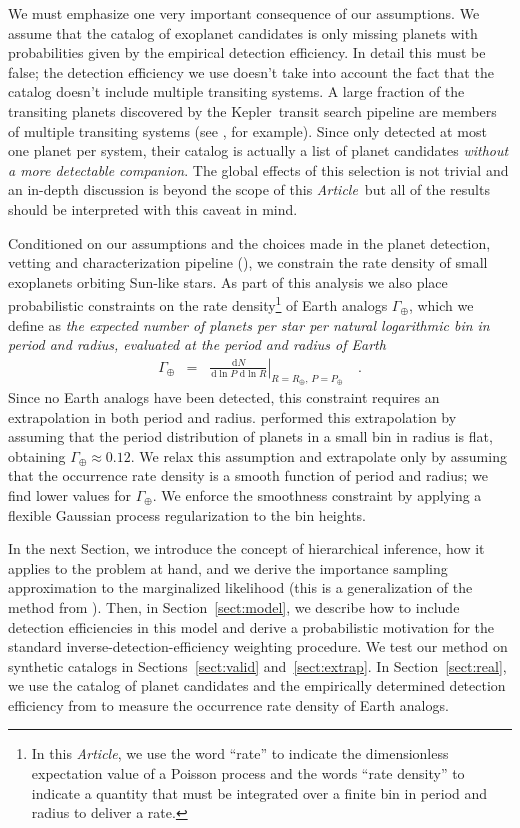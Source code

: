 \documentclass[12pt,preprint]{aastex}
\newcommand{\project}[1]{{\sffamily #1}}
\newcommand{\kepler}{\project{Kepler}}
\newcommand{\paper}{\textsl{Article}}
\newcommand{\Sect}[1]{Section~\ref{sect:#1}}
\newcommand{\sect}[1]{\Sect{#1}}
\newcommand{\sectalt}[1]{\ref{sect:#1}}
\newcommand{\dd}{\ensuremath{\,\mathrm{d}}}
\newcommand{\rate}{\ensuremath{\Gamma}}
\newcommand{\radius}{\ensuremath{R}}
\newcommand{\period}{\ensuremath{P}}
\newcommand{\gammaearth}{{\ensuremath{\rate_\oplus}}}
\begin{document}
We must emphasize one very important consequence of our assumptions.
We assume that the catalog of exoplanet candidates is only missing planets
with probabilities given by the empirical detection efficiency.
In detail this must be false; the detection efficiency we use
doesn't take into account the fact that the catalog doesn't include multiple
transiting systems.
A large fraction of the transiting planets discovered by the \kepler\ transit
search pipeline are members of multiple transiting systems (see
\citealt{lissauer}, for example).
Since \citet{petigura} only detected at most one planet per system, their
catalog is actually a list of planet candidates \emph{without a more
detectable companion}.
The global effects of this selection is not trivial and an in-depth discussion
is beyond the scope of this \paper\ but all of the results should be
interpreted with this caveat in mind.

Conditioned on our assumptions and the choices made in the planet detection,
vetting and characterization pipeline (\citealt{petigura-a, petigura}), we
constrain the rate density of small exoplanets orbiting Sun-like stars.
As part of this analysis we also place probabilistic constraints on the rate
density\footnote{In this \paper, we use the word ``rate'' to indicate the
dimensionless expectation value of a Poisson process and the words ``rate
density'' to indicate a quantity that must be integrated over a finite bin in
period and radius to deliver a rate.} of Earth analogs \gammaearth, which we
define as \emph{the expected number of planets per star per natural
logarithmic bin in period and radius, evaluated at the period and radius of
Earth}
\begin{eqnarray}
\gammaearth &=&
\left.\frac{\dd N}{\dd\ln\period\,\dd\ln\radius}\right|
_{\radius=\radius_\oplus,\,\period=\period_\oplus}\quad.
\end{eqnarray}
Since no Earth analogs have been detected, this constraint requires an
extrapolation in both period and radius.
\citet{petigura} performed this extrapolation by assuming that the period
distribution of planets in a small bin in radius is flat, obtaining
$\gammaearth \approx 0.12$.
We relax this assumption and extrapolate only by assuming that the occurrence
rate density is a smooth function of period and radius; we find lower values
for \gammaearth.
We enforce the smoothness constraint by applying a flexible Gaussian process
regularization to the bin heights.

In the next Section, we introduce the concept of hierarchical inference, how
it applies to the problem at hand, and we derive the importance sampling
approximation to the marginalized likelihood (this is a generalization of the
method from \citealt{hogge}).
Then, in \sect{model}, we describe how to include detection efficiencies in
this model and derive a probabilistic motivation for the standard
inverse-detection-efficiency weighting procedure.
We test our method on synthetic catalogs in Sections~\sectalt{valid}
and~\sectalt{extrap}.
In \sect{real}, we use the catalog of planet candidates and the empirically
determined detection efficiency from \citet{petigura} to measure the
occurrence rate density of Earth analogs.
\end{document}
